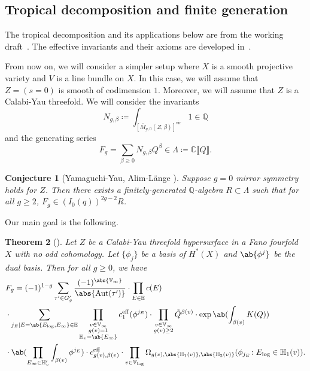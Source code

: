 \documentclass{amsart}
\newtheorem{thm}{Theorem}[section]
\newtheorem{conj}[thm]{Conjecture}
\theoremstyle{definition}
\theoremstyle{remark}
\theoremstyle{plain}
\theoremstyle{definition}
\theoremstyle{remark}
\newcommand{\C}{\mathbb{C}}
\newcommand{\Q}{\mathbb{Q}}
\newcommand{\E}{\mathbb{E}}
\newcommand{\V}{\mathbb{V}}
\renewcommand{\H}{\mathbb{H}}
\newcommand{\mr}[1]{\mathrm{#1}}
\newcommand{\on}[1]{\operatorname{#1}}
\newcommand{\1}{\mathbf{1}}
\newcommand{\2}{\mathbf{2}}
\newcommand{\3}{\mathbf{3}}
\newcommand{\vir}{\mr{vir}}
\newcommand{\ps}[1]{\llbracket #1 \rrbracket}
\DeclareMathOperator{\Aut}{Aut}
\begin{document}
\subsection{Tropical decomposition and finite generation}%
\label{sub:Tropical decomposition and finite generation}

The tropical decomposition and its applications below are from the working draft~\cite{CJRtropical2025}. The effective invariants and their axioms are developed in~\cite{CJRpunctured}.

From now on, we will consider a simpler setup where \(X\) is a smooth projective variety and \(V\) is a line bundle on \(X\). In this case, we will assume that \(Z = (s = 0)\) is smooth of codimension \(1\). Moreover, we will assume that \(Z\) is a Calabi-Yau threefold. We will consider the invariants
\[ N_{g, \beta} \coloneqq \int_{[\bar{M}_{g,0}(Z, \beta)]^{\vir}} 1 \in \Q \]
and the generating series
\[ F_g = \sum_{\beta \geq 0} N_{g, \beta} Q^{\beta} \in \Lambda \coloneqq \C \ps{Q}. \]

\begin{conj}[Yamaguchi-Yau, Alim-L\"ange {\cite{YY2004,AlimLange2007}}]
    Suppose \(g=0\) mirror symmetry holds for \(Z\). Then there exists a finitely-generated \(\Q\)-algebra \(R \subset \Lambda\) such that for all \(g \geq 2\), \(F_g \in (I_0(q))^{2g-2} R\).
\end{conj}

Our main goal is the following.

\begin{thm}[{\cite{CJRtropical2025}}]
    Let \(Z\) be a Calabi-Yau threefold hypersurface in a Fano fourfold \(X\) with no odd cohomology. Let \(\{\phi_j\}\) be a basis of \(H^*(X)\) and \(\ab\{\phi^j\}\) be the dual basis. Then for all \(g \geq 0\), we have
    \begin{align*}
        &F_g = (-1)^{1-g} \sum_{\tau' \in G_g'} \frac{(-1)^{\abs{\V_{\infty}}}}{\abs{\Aut(\tau')}} \cdot \prod_{E \in \E} c(E) \\
        & \cdot \sum_{j_E \mid E = \ab\{E_{\log}, E_{\infty}\} \in \E} \prod_{\substack{v \in \V_{\infty} \\ g(v)=1 \\ \H_v = \ab\{E_{\infty}\}}} c_1^{\mr{eff}}(\phi^{j_E}) \cdot \prod_{\substack{v \in \V_{\infty} \\ g(v) \geq 2}} \tilde{Q}^{\beta(v)} \cdot \exp \ab(\int_{\beta(v)} K(Q) )  \\
        & \cdot \ab(\prod_{E_{\infty} \in \H_v'}\int_{\beta(v)} \phi^{j_E}) \cdot c_{g(v), \beta(v)}^{\on{eff}} 
         \cdot \prod_{v \in \V_{\log}} \Omega_{g(v), \abs{\H_1(v)}, \abs{\H_2(v)}} (\phi_{j_E} \colon E_{\log} \in \H_1(v)).
    \end{align*}
\end{thm}
\end{document}
